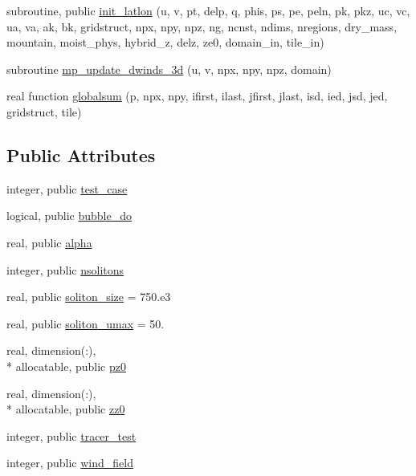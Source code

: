 \begin{DoxyCompactItemize}
subroutine, public \hyperlink{classtest__cases__mod_ac5330b5b0801ece5e8c1af330fa5b56f}{init\-\_\-latlon} (u, v, pt, delp, q, phis, ps, pe, peln, pk, pkz, uc, vc, ua, va, ak, bk, gridstruct, npx, npy, npz, ng, ncnst, ndims, nregions, dry\-\_\-mass, mountain, moist\-\_\-phys, hybrid\-\_\-z, delz, ze0, domain\-\_\-in, tile\-\_\-in)
\item 
subroutine \hyperlink{classtest__cases__mod_aaf90c31f08adcf89ab5371621c45e133}{mp\-\_\-update\-\_\-dwinds\-\_\-3d} (u, v, npx, npy, npz, domain)
\item 
real function \hyperlink{classtest__cases__mod_ae3755b5352d28b3b8b06940f3dd4feac}{globalsum} (p, npx, npy, ifirst, ilast, jfirst, jlast, isd, ied, jsd, jed, gridstruct, tile)
\end{DoxyCompactItemize}
\subsection*{Public Attributes}
\begin{DoxyCompactItemize}
\item 
integer, public \hyperlink{classtest__cases__mod_a7b2088f8d78d58d88ac4f8cf8f80dea8}{test\-\_\-case}
\item 
logical, public \hyperlink{classtest__cases__mod_ac308b4d1b61239d29b7ce8fbaee02d16}{bubble\-\_\-do}
\item 
real, public \hyperlink{classtest__cases__mod_a37da311f66b6290a538efb4c6e91b846}{alpha}
\item 
integer, public \hyperlink{classtest__cases__mod_a124b5e4b27425c730d7182f93a7cb99d}{nsolitons}
\item 
real, public \hyperlink{classtest__cases__mod_aae86f201bdb1a209b7a9c0e26a39feda}{soliton\-\_\-size} = 750.e3
\item 
real, public \hyperlink{classtest__cases__mod_a6691463cf0a75416609c200f6cc0bc62}{soliton\-\_\-umax} = 50.
\item 
real, dimension(\-:), \\*
allocatable, public \hyperlink{classtest__cases__mod_a829a6dcd90e3fecd02c918dc2d107c7e}{pz0}
\item 
real, dimension(\-:), \\*
allocatable, public \hyperlink{classtest__cases__mod_a086960ce4bdf89402a7595af28e5d04a}{zz0}
\item 
integer, public \hyperlink{classtest__cases__mod_a045ac76cf8976a508e18b8f03ba2f57f}{tracer\-\_\-test}
\item 
integer, public \hyperlink{classtest__cases__mod_a81ce24e79fd0973f5bfc7fdc8aaf16a8}{wind\-\_\-field}
\end{DoxyCompactItemize}
